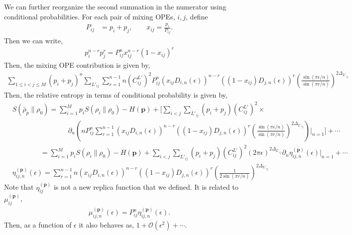 \documentclass[11pt]{article}
\newcommand{\ep}{\epsilon}
\newcommand{\p}{\partial}
\newcommand{\mO}{\mathcal{O}}
\newcommand{\nn}{\nonumber}
\newcommand{\lb}{\left(}
\newcommand{\rb}{\right)}
\begin{document}
We can further  reorganize the second summation in the numerator using conditional probabilities. For each pair of mixing OPEs, $i,j$, define 
\begin{align}
    P_{ij} &= p_i + p_j, \qquad
    x_{ij} = \frac{p_i}{P_{ij}}.
\end{align}
Then we can write,
\begin{align}
    p_i^{n-r}p_j^r = P_{ij}^n x_{ij}^{n-r}(1-x_{ij})^r
\end{align}
Then, the mixing OPE contribution is given by,
\begin{align}
    \sum_{1\leq i<j\leq M}(p_i + p_j)^n\sum_{L'_{ij}}\sum_{r=1}^{n-1}n \lb C_{ij}^{L'}\rb^2 P_{ij}^n \lb x_{ij}D_{i,n}(\ep)\rb^{n-r}\lb (1-x_{ij})D_{j,n}(\ep)\rb^r \lb\frac{\sin (\pi \ep/n)}{\sin (\pi r/n)}\rb^{2\Delta_{L'_{ij}}}
\end{align}
Then, the relative entropy in terms of conditional probability is given by,
\begin{align}
    &S(\bar{\rho}_p\| \rho_0) = \sum_{i=1}^M p_i S(\rho_i \|\rho_0)-  H(\textbf{p})+ \Bigg[\sum_{i<j}\sum_{L'_{ij}}(p_i + p_j)  \lb C_{ij}^{L'}\rb^2 \times\nn \\&
    \qquad\qquad \qquad\qquad \p_n\lb nP_{ij}^n\sum_{r=1}^{n-1}  \lb x_{ij}D_{i,n}(\ep)\rb^{n-r}\lb(1-x_{ij})D_{j,n}(\ep)\rb^r \lb\frac{\sin (\pi \ep/n)}{\sin (\pi r/n)}\rb^{2\Delta_{L'_{ij}}} \rb\Bigg|_{n=1}\Bigg]+\cdots \\
    &\qquad\qquad = \sum_{i=1}^M p_i S(\rho_i \|\rho_0) - H(\textbf{p}) + \sum_{i<j}\sum_{L'_{ij}}(p_i + p_j) \lb C_{ij}^{L'}\rb^2 (2\pi\ep)^{2\Delta_{L'_{ij}}} \p_n \eta_{ij,n}^{(\textbf{p})} \lb \ep\rb\Bigg|_{n=1}+\cdots \\
    &\eta_{ij,n}^{(\textbf{p})} \lb \ep\rb =  \sum_{r=1}^{n-1}  n\lb x_{ij}D_{i,n}(\ep)\rb^{n-r}\lb(1-x_{ij})D_{j,n}(\ep)\rb^r\lb\frac{1}{2\sin (\pi r/n)}\rb^{2\Delta_{L'_{ij}}} 
\end{align}
Note that $\eta_{ij}^{(\textbf{p})}$ is not a new replica function that we defined. It is related to $\mu_{ij}^{(\textbf{p})}$,
\begin{align}
    \mu_{ij,n}^{(\textbf{p})}\lb \ep\rb = P_{ij}^n\eta_{ij,n}^{(\textbf{p})} \lb \ep\rb .
\end{align}
Then, as a function of $\ep$ it also behaves as, 
$1+ \mO(\ep^2) + \cdots$. 
\end{document}
